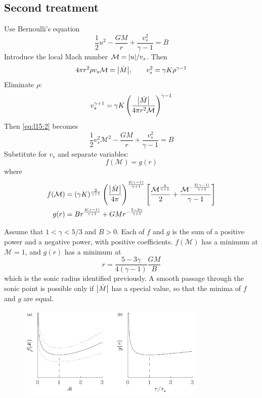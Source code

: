 \documentclass{jknotes}
\newcommand{\M}{\mathcal{M}}
\begin{document}
\subsection{Second treatment}
Use Bernoulli's equation
\begin{equation}
	\frac{1}{2}u^2 - \frac{GM}{r} + \frac{v_s^2}{\gamma -1} = B
	\label{eq:l15:2}
\end{equation}
Introduce the local Mach number $\M = \abs{u}/v_s$. Then
\begin{equation}
	4\pi r^2 \rho v_s \M = \abs{\dot{M}}, \hspace{2em} v_s^2 = \gamma K
	\rho^{\gamma -1}
\end{equation}
Eliminate $\rho$:
\begin{equation}
	v_s^{\gamma +1} = \gamma K \left( \frac{\abs{\dot{M}}}{4\pi r^2
	\M}\right)^{\gamma -1}
\end{equation}
Then \eqref{eq:l15:2} becomes
\begin{equation}
	\frac{1}{2}v_s^2 \M^2 - \frac{GM}{r} + \frac{v_s^2}{\gamma -1} = B
\end{equation}
Substitute for $v_s$ and separate variables:
\begin{equation}
	f(\M) = g(r)
\end{equation}
where
\begin{align}
	f(\M) &= (\gamma K)^{\frac{2}{\gamma +1}}
	\left(\frac{\abs{\dot{M}}}{4\pi}\right)^{\frac{2(\gamma -1)}{\gamma +1}}
	\left[ \frac{\M^{\frac{4}{\gamma +1}}}{2} + \frac{\M^{-\frac{2(\gamma
	-1)}{\gamma +1}}}{\gamma -1}\right] \\
	g(r) &= Br^{\frac{4(\gamma -1)}{\gamma +1}} + GM
	r^{-\frac{5-3\gamma}{\gamma +1}}
\end{align}

Assume that $1 < \gamma < 5/3$ and $B > 0$. Each of $f$ and $g$ is the sum of
a positive power and a negative power, with positive coefficients. $f(\M)$ has
a minimum at $\M = 1$, and $g(r)$ has a minimum at
\begin{equation}
	r = \frac{5-3\gamma}{4(\gamma -1)}\frac{GM}{B}
\end{equation}
which is the sonic radius identified previously. A smooth passage through the
sonic point is possible only if $\abs{\dot{M}}$ has a special value, so that
the minima of $f$ and $g$ are equal.
\begin{figure}[h]
	\centering
	\includegraphics[width=0.8\textwidth]{stellar_wind.png}
\end{figure}
\end{document}

